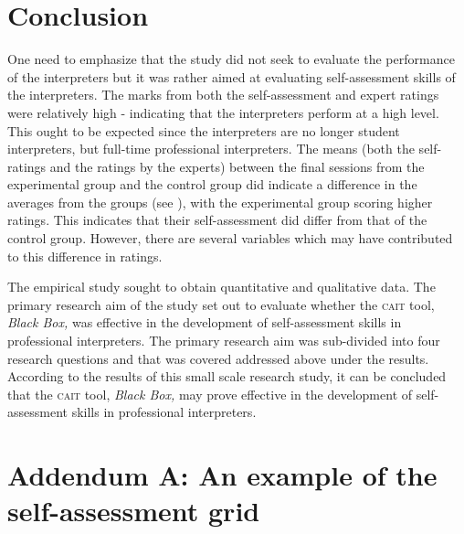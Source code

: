 \documentclass[output=paper]{langsci/langscibook}
\begin{document}
\section{Conclusion}

One need to emphasize that the study did not seek to evaluate the performance of the interpreters but it was rather aimed at evaluating self-assessment skills of the interpreters. The marks from both the self-assessment and expert ratings were relatively high -  indicating that the interpreters perform at a high level. This ought to be expected since the interpreters are no longer student interpreters, but full-time professional interpreters. The means (both the self-ratings and the ratings by the experts) between the final sessions from the experimental group and the control group did indicate a difference in the averages from the groups (see ), with the experimental group scoring higher ratings. This indicates that their self-assessment did differ from that of the control group. However, there are several variables which may have contributed to this difference in ratings.  

The empirical study sought to obtain quantitative and qualitative data. The primary research aim of the study set out to evaluate whether the \textsc{cait} tool, \textit{Black Box,} was effective in the development of self-assessment skills in professional interpreters. The primary research aim was sub-divided into four research questions and that was covered addressed above under the results. According to the results of this small scale research study, it can be concluded that the \textsc{cait} tool, \textit{Black Box,} may prove effective in the development of self-assessment skills in professional interpreters. 


\section*{Addendum A: An example of the self-assessment grid}
\label{03:addendum:A}
\renewcommand{\arraystretch}{2}
\newlength{\tablewidth}\setlength{\tablewidth}{20cm}
\newlength{\cellwidth}\setlength{\cellwidth}{0.033\tablewidth}
\newlength{\rowwidth}\setlength{\rowwidth}{30\cellwidth}
\end{document}
